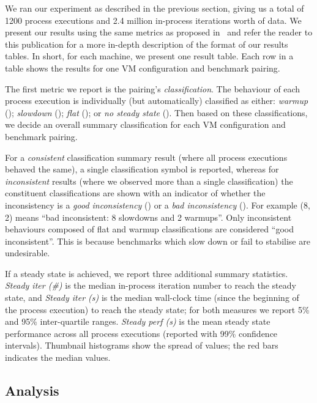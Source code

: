 \documentclass[a4paper]{article}
\begin{document}
We ran our experiment as described in the previous section, giving us a total
of 1200 process executions and 2.4 million in-process iterations worth of data.
We present our results using the same metrics as proposed
in~\cite{barrett16warmup} and refer the reader to this publication for a more
in-depth description of the format of our results tables. In short, for each
machine, we present one result table. Each row in a table shows the results for
one VM configuration and benchmark pairing.

The first metric we report is the pairing's \emph{classification}. The
behaviour of each process execution is individually (but automatically) classified as either:
\emph{warmup} (\warmup); \emph{slowdown} (\slowdown); \emph{flat} (\flatc); or
\emph{no steady state} (\nosteadystate). Then based on these classifications,
we decide an overall summary classification for each VM configuration and benchmark
pairing.

For a \emph{consistent} classification summary result (where all process
executions behaved the same), a single classification symbol is reported,
whereas for \emph{inconsistent} results (where we observed more than a single
classification) the constituent classifications are shown with an indicator of
whether the inconsistency is a \emph{good inconsistency} (\goodinconsistent)
or a \emph{bad inconsistency} (\badinconsistent). For example
\badinconsistent(8\slowdown, 2\warmup) means ``bad inconsistent: 8 slowdowns
and 2 warmups''. Only inconsistent behaviours composed of flat and warmup
classifications are considered ``good inconsistent''. This is because
benchmarks which slow down or fail to stabilise are undesirable.

If a steady state is achieved, we report three additional summary statistics.
\emph{Steady iter (\#)} is the median in-process iteration number to reach the
steady state, and \emph{Steady iter (s)} is the median wall-clock time (since
the beginning of the process execution) to reach the steady state; for both
measures we report 5\% and 95\% inter-quartile ranges. \emph{Steady perf (s)}
is the mean steady state performance across all process executions (reported
with 99\% confidence intervals). Thumbnail histograms show the spread of
values; the red bars indicates the median values.

\subsection{Analysis}
\end{document}
